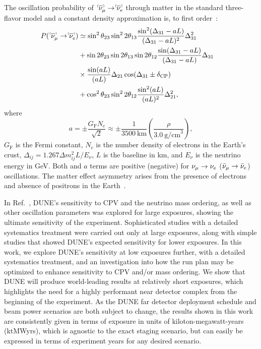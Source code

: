 The oscillation probability of $\;\nu^{\bracketbar}_\mu \rightarrow \nu^{\bracketbar}_e$ through matter in the standard three-flavor model and a constant density approximation is, to first order~\cite{Nunokawa:2007qh}:
\begin{equation}
  \begin{aligned}
    P(\;\nu^{\bracketbar}_\mu \rightarrow \nu^{\bracketbar}_e) & \simeq \sin^2 \theta_{23} \sin^2 2 \theta_{13} 
    \frac{ \sin^2(\Delta_{31} - aL)}{(\Delta_{31}-aL)^2} \Delta_{31}^2 \\
    & + \sin 2 \theta_{23} \sin 2 \theta_{13} \sin 2 \theta_{12}\frac{ \sin(\Delta_{31} - aL)}{(\Delta_{31}-aL)} \Delta_{31} \\
    &\times \frac{\sin(aL)}{(aL)} \Delta_{21} \cos (\Delta_{31} \pm \deltacp) & \\
    & + \cos^2 \theta_{23} \sin^2 2 \theta_{12} \frac {\sin^2(aL)}{(aL)^2} \Delta_{21}^2,
  \end{aligned}
  \label{eqn:appprob}
\end{equation}
where
\begin{equation*}
  a = \pm \frac{G_{\mathrm{F}}N_e}{\sqrt{2}} \approx \pm\frac{1}{3500~\mathrm{km}}\left(\frac{\rho}{3.0~\mathrm{g/cm}^{3}}\right),
\end{equation*}
$G_{\mathrm{F}}$ is the Fermi constant, $N_e$ is the number density of electrons in the Earth's crust, $\Delta_{ij} = 1.267 \Delta m^2_{ij} L/E_\nu$, $L$ is the baseline in km, and $E_\nu$ is the neutrino energy in GeV. 
Both \deltacp and $a$ terms are positive (negative) for $\nu_\mu \to \nu_e$ ($\bar\nu_\mu \to \bar\nu_e$) oscillations. The matter effect asymmetry arises from the presence of electrons and absence of positrons in the Earth~\cite{Wolfenstein:1977ue,Mikheev:1986gs}.

In Ref.~\cite{Abi:2020qib}, DUNE's sensitivity to CPV and the neutrino mass ordering, as well as other oscillation parameters was explored for large exposures, showing the ultimate sensitivity of the experiment. Sophisticated studies with a detailed systematics treatment were carried out only at large exposures, along with simple studies that showed DUNE's expected sensitivity for lower exposures. In this work, we explore DUNE's sensitivity at low exposures further, with a detailed systematics treatment, and an investigation into how the run plan may be optimized to enhance sensitivity to CPV and/or mass ordering. We show that DUNE will produce world-leading results at relatively short exposures, which highlights the need for a highly performant near detector complex from the beginning of the experiment. As the DUNE far detector deployment schedule and beam power scenarios are both subject to change, the results shown in this work are consistently given in terms of exposure in units of kiloton-megawatt-years (ktMWyrs), which is agnostic to the exact staging scenario, but can easily be expressed in terms of experiment years for any desired scenario.

